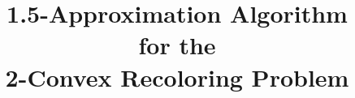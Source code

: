 \title{
1.5-Approximation Algorithm \\
for the \\
2-Convex Recoloring Problem
}
\begin{frame}
\titlepage
\end{frame}
